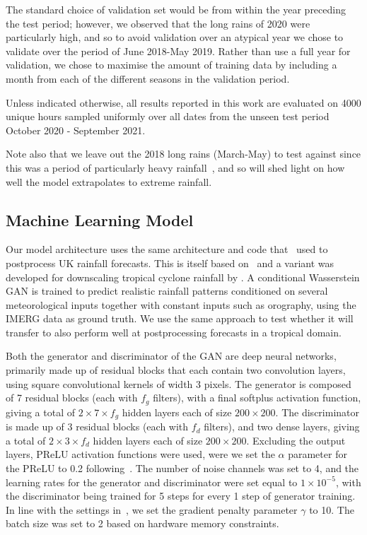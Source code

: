 \documentclass{article}
\begin{document}
The standard choice of validation set would be from within the year preceding the test period; however, we observed that the long rains of 2020 were particularly high, and so to avoid validation over an atypical year we chose to validate over the period of June 2018-May 2019. Rather than use a full year for validation, we chose to maximise the amount of training data by including a month from each of the different seasons in the validation period. 

Unless indicated otherwise, all results reported in this work are evaluated on 4000 unique hours sampled uniformly over all dates from the unseen test period October 2020 - September 2021.

Note also that we leave out the 2018 long rains (March-May) to test against since this was a period of particularly heavy rainfall~\citep{kilavi_extreme_2018}, and so will shed light on how well the model extrapolates to extreme rainfall. 



\subsection{Machine Learning Model}




Our model architecture uses the same architecture and code that~\cite{harris_generative_2022} used to postprocess UK rainfall forecasts. This is itself based on~\cite{leinonen_stochastic_2020} and a variant was developed for downscaling tropical cyclone rainfall by \cite{vosper_deep_2023}. A conditional Wasserstein GAN is trained to predict realistic rainfall patterns conditioned on several meteorological inputs together with constant inputs such as orography, using the IMERG data as ground truth. We use the same approach to test whether it will transfer to also perform well at postprocessing forecasts in a tropical domain. 

Both the generator and discriminator of the GAN are deep neural networks, primarily made up of residual blocks that each contain two convolution layers, using square convolutional kernels of width 3 pixels. The generator is composed of 7 residual blocks (each with $f_g$ filters), with a final softplus activation function, giving a total of $2 \times 7 \times f_g$ hidden layers each of size $200 \times 200$. The discriminator is made up of 3 residual blocks (each with $f_d$ filters), and two dense layers, giving a total of $2 \times 3 \times f_d$ hidden layers each of size $200 \times 200$. 
Excluding the output layers, PReLU activation functions were used, were we set the $\alpha$ parameter for the PReLU to 0.2 following~\cite{harris_generative_2022}. The number of noise channels was set to 4, and the learning rates for the generator and discriminator were set equal to $1\times 10^{-5}$, with the discriminator being trained for 5 steps for every 1 step of generator training. In line with the settings in~\cite{gulrajani_improved_2017}, we set the gradient penalty parameter $\gamma$ to 10. The batch size was set to 2 based on hardware memory constraints.
\end{document}
